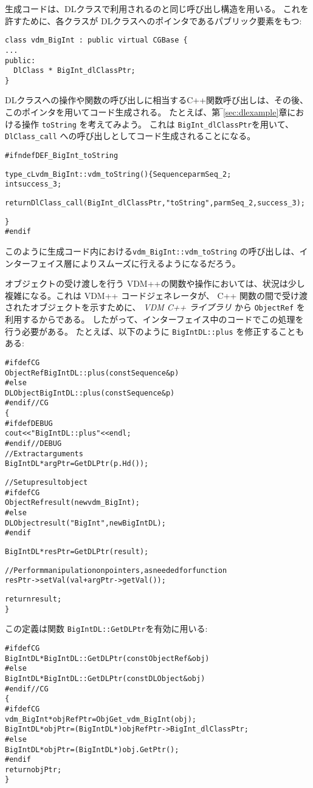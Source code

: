 \documentclass[\pformat,12pt]{jarticle}
\newcommand{\vdmcpplib}{\textit{VDM C++ ライブラリ}}
\begin{document}
生成コードは、DLクラスで利用されるのと同じ呼び出し構造を用いる。
これを許すために、各クラスが DLクラスへのポインタであるパブリック要素をもつ:
\begin{verbatim}
class vdm_BigInt : public virtual CGBase {
...
public:
  DlClass * BigInt_dlClassPtr;
}
\end{verbatim}
DLクラスへの操作や関数の呼び出しに相当するC++関数呼び出しは、その後、このポインタを用いてコード生成される。
たとえば、第‾\ref{sec:dlexample}章における操作 \texttt{toString} を考えてみよう。
これは \texttt{BigInt\_dlClassPtr}を用いて、\texttt{DlClass\_call} への呼び出しとしてコード生成されることになる。
\begin{alltt}
\#ifndef DEF_BigInt_toString
 
type_cL vdm_BigInt::vdm_toString () \{  Sequence parmSeq_2;
  int success_3;
 
  return DlClass_call(BigInt_dlClassPtr, "toString", parmSeq_2, success_3);
 
\}
\#endif   
\end{alltt}
このように生成コード内における\texttt{vdm\_BigInt::vdm\_toString} の呼び出しは、インターフェイス層によりスムーズに行えるようになるだろう。

オブジェクトの受け渡しを行う VDM++の関数や操作においては、状況は少し複雑になる。これは VDM++ コードジェネレータが、 C++ 関数の間で受け渡されたオブジェクトを示すために、 {\vdmcpplib} から \texttt{ObjectRef} を利用するからである。 
したがって、インターフェイス中のコードでこの処理を行う必要がある。
たとえば、以下のように \texttt{BigIntDL::plus} を修正することもある:
\begin{alltt}
\#ifdef CG
ObjectRef BigIntDL::plus (const Sequence &p)
\#else
DLObject BigIntDL::plus (const Sequence &p)
\#endif //CG
\{
\#ifdef DEBUG
  cout << "BigIntDL::plus" << endl;
\#endif //DEBUG
  // Extract arguments
  BigIntDL *argPtr = GetDLPtr(p.Hd());

  // Set up result object
\#ifdef CG
  ObjectRef result (new vdm_BigInt);
\#else
  DLObject result("BigInt", new BigIntDL);
\#endif 

  BigIntDL *resPtr = GetDLPtr(result);

  // Perform manipulation on pointers, as needed for function
  resPtr->setVal( val + argPtr->getVal());

  return result;
\}
\end{alltt}
この定義は関数 \texttt{BigIntDL::GetDLPtr}を有効に用いる:
\begin{alltt}
\#ifdef CG
BigIntDL *BigIntDL::GetDLPtr(const ObjectRef& obj)
\#else
BigIntDL *BigIntDL::GetDLPtr(const DLObject& obj)
\#endif //CG
\{
\#ifdef CG
  vdm_BigInt *objRefPtr = ObjGet_vdm_BigInt(obj);
  BigIntDL *objPtr = (BigIntDL*) objRefPtr->BigInt_dlClassPtr;
\#else
  BigIntDL *objPtr = (BigIntDL*) obj.GetPtr(); 
\#endif
  return objPtr;
\}
\end{alltt}
\end{document}
